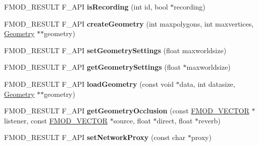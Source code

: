 \begin{DoxyCompactItemize}
\item 
\hypertarget{class_f_m_o_d_1_1_system_a30d96283b97941279b8896a5993c6592}{F\-M\-O\-D\-\_\-\-R\-E\-S\-U\-L\-T F\-\_\-\-A\-P\-I {\bfseries is\-Recording} (int id, bool $\ast$recording)}\label{class_f_m_o_d_1_1_system_a30d96283b97941279b8896a5993c6592}

\item 
\hypertarget{class_f_m_o_d_1_1_system_a3652e6e628a0b634f3670d40fde05938}{F\-M\-O\-D\-\_\-\-R\-E\-S\-U\-L\-T F\-\_\-\-A\-P\-I {\bfseries create\-Geometry} (int maxpolygons, int maxvertices, \hyperlink{class_f_m_o_d_1_1_geometry}{Geometry} $\ast$$\ast$geometry)}\label{class_f_m_o_d_1_1_system_a3652e6e628a0b634f3670d40fde05938}

\item 
\hypertarget{class_f_m_o_d_1_1_system_a421603edcdc170de9d72d8ab95ee0fbd}{F\-M\-O\-D\-\_\-\-R\-E\-S\-U\-L\-T F\-\_\-\-A\-P\-I {\bfseries set\-Geometry\-Settings} (float maxworldsize)}\label{class_f_m_o_d_1_1_system_a421603edcdc170de9d72d8ab95ee0fbd}

\item 
\hypertarget{class_f_m_o_d_1_1_system_a4466ede69006041d702b6ac5be162c57}{F\-M\-O\-D\-\_\-\-R\-E\-S\-U\-L\-T F\-\_\-\-A\-P\-I {\bfseries get\-Geometry\-Settings} (float $\ast$maxworldsize)}\label{class_f_m_o_d_1_1_system_a4466ede69006041d702b6ac5be162c57}

\item 
\hypertarget{class_f_m_o_d_1_1_system_af9aa1402e3132a854037625ea6fabd4e}{F\-M\-O\-D\-\_\-\-R\-E\-S\-U\-L\-T F\-\_\-\-A\-P\-I {\bfseries load\-Geometry} (const void $\ast$data, int datasize, \hyperlink{class_f_m_o_d_1_1_geometry}{Geometry} $\ast$$\ast$geometry)}\label{class_f_m_o_d_1_1_system_af9aa1402e3132a854037625ea6fabd4e}

\item 
\hypertarget{class_f_m_o_d_1_1_system_ac1c462ead8eef9cbb955a898cd1c64a9}{F\-M\-O\-D\-\_\-\-R\-E\-S\-U\-L\-T F\-\_\-\-A\-P\-I {\bfseries get\-Geometry\-Occlusion} (const \hyperlink{struct_f_m_o_d___v_e_c_t_o_r}{F\-M\-O\-D\-\_\-\-V\-E\-C\-T\-O\-R} $\ast$listener, const \hyperlink{struct_f_m_o_d___v_e_c_t_o_r}{F\-M\-O\-D\-\_\-\-V\-E\-C\-T\-O\-R} $\ast$source, float $\ast$direct, float $\ast$reverb)}\label{class_f_m_o_d_1_1_system_ac1c462ead8eef9cbb955a898cd1c64a9}

\item 
\hypertarget{class_f_m_o_d_1_1_system_ab1368bd2bd2bcba58d4c70c385277bd1}{F\-M\-O\-D\-\_\-\-R\-E\-S\-U\-L\-T F\-\_\-\-A\-P\-I {\bfseries set\-Network\-Proxy} (const char $\ast$proxy)}\label{class_f_m_o_d_1_1_system_ab1368bd2bd2bcba58d4c70c385277bd1}


\end{DoxyCompactItemize}
